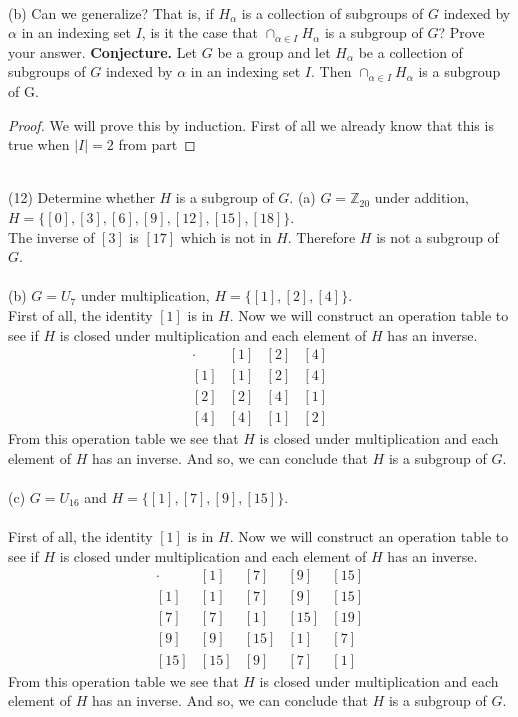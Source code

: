 \documentclass[11pt,a4paper]{article}
\begin{document}
~\\
(b) Can we generalize? That is, if ${H_\alpha}$ is a collection of subgroups of $G$ indexed by $\alpha$ in an indexing set $I$, is it the case that $\cap_{\alpha\in I} H_\alpha$ is a subgroup of $G$? Prove your answer.
{\bf Conjecture.} Let $G$ be a group and let ${H_\alpha}$ be a collection of subgroups of $G$ indexed by $\alpha$ in an indexing set $I$. Then $\cap_{\alpha\in I} H_\alpha$ is a subgroup of G.

\begin{proof}
We will prove this by induction. First of all we already know that this is true when $|I|=2$ from part 
\end{proof}
~\\
(12) Determine whether $H$ is a subgroup of $G$.
(a) $G=\mathbb{Z}_{20}$ under addition, $H=\{[0],[3],[6],[9],[12],[15],[18]\}$.\\
The inverse of $[3]$ is $[17]$ which is not in $H$. Therefore $H$ is not a subgroup of $G$.\\
~\\
(b) $G=U_7$ under multiplication, $H=\{[1],[2],[4]\}$.\\
First of all, the identity $[1]$ is in $H$. Now we will construct an operation table to see if $H$ is closed under multiplication and each element of $H$ has an inverse.
\[
\begin{array}{c|c|c|c}
\cdot & [1] & [2] & [4]\\\hline
[1] & [1] & [2] & [4]\\\hline
[2] & [2] & [4] & [1]\\\hline
[4] & [4] & [1] & [2]
\end{array}
\]
From this operation table we see that $H$ is closed under multiplication and each element of $H$ has an inverse. And so, we can conclude that $H$ is a subgroup of $G$.\\
~\\
(c) $G=U_{16}$ and $H=\{[1],[7],[9],[15]\}$.\\
~\\
First of all, the identity $[1]$ is in $H$. Now we will construct an operation table to see if $H$ is closed under multiplication and each element of $H$ has an inverse.
\[
\begin{array}{c|c|c|c|c}
\cdot & [1] & [7] & [9] & [15] \\\hline
[1] & [1] & [7] & [9] & [15]\\ \hline
[7] & [7] & [1] & [15] & [19] \\ \hline
[9] & [9] & [15] & [1] & [7] \\ \hline
[15] & [15] & [9] & [7] & [1]
\end{array} 
\]
From this operation table we see that $H$ is closed under multiplication and each element of $H$ has an inverse. And so, we can conclude that $H$ is a subgroup of $G$.\\
\end{document}

